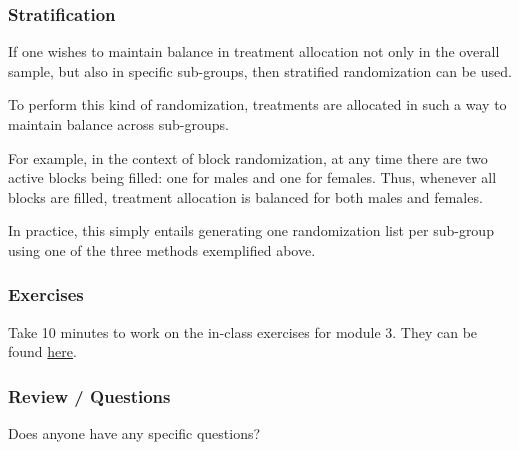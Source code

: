 \documentclass{beamer}
\begin{document}
\begin{frame}
    \frametitle{Stratification}
    If one wishes to maintain balance in treatment allocation not only in the overall sample, but also
    in specific sub-groups, then stratified randomization can be used.

    \bigskip

    To perform this kind of randomization, treatments are allocated in such a way to maintain balance across sub-groups.

    \bigskip

    For example, in the context of block randomization, at any time there are two active blocks being filled:
    one for males and one for females. Thus, whenever all blocks are filled, treatment allocation is balanced
    for both males and females.

    \bigskip

    In practice, this simply entails generating one randomization list per sub-group using one of the three
    methods exemplified above.
\end{frame}


\begin{frame}
    \frametitle{Exercises}
    Take 10 minutes to work on the in-class exercises for module 3.
    They can be found \href{https://github.com/rnitulescu/RcourseOncology2021/blob/master/exercises3.R}{here}.
\end{frame}


\begin{frame}
    \frametitle{Review / Questions}
    \vfill
    Does anyone have any specific questions?
    \vfill
\end{frame}


\end{document}
